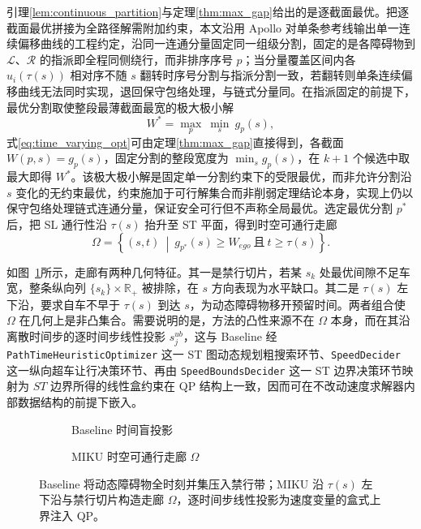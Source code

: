 \documentclass[a4paper,zihao=5]{ctexart}
\theoremstyle{definition}
\begin{document}
引理\ref{lem:continuous_partition}与定理\ref{thm:max_gap}给出的是逐截面最优。把逐截面最优拼接为全路径解需附加约束，本文沿用 Apollo 对单条参考线输出单一连续偏移曲线的工程约定，沿同一连通分量固定同一组级分割，固定的是各障碍物到 $\mathcal{L}$、$\mathcal{R}$ 的指派即全程同侧绕行，而非排序序号 $p$；当分量覆盖区间内各 $u_i(\tau(s))$ 相对序不随 $s$ 翻转时序号分割与指派分割一致，若翻转则单条连续偏移曲线无法同时实现，退回保守包络处理，与链式分量同。在指派固定的前提下，最优分割取使整段最薄截面最宽的极大极小解
\begin{equation}
    W^{*} = \max_{p}\ \min_{s}\ g_p(s),
    \label{eq:time_varying_opt}
\end{equation}
式\eqref{eq:time_varying_opt}可由定理\ref{thm:max_gap}直接得到，各截面 $W(p,s)=g_p(s)$，固定分割的整段宽度为 $\min_s g_p(s)$，在 $k+1$ 个候选中取最大即得 $W^{*}$。该极大极小解是固定单一分割约束下的受限最优，而非允许分割沿 $s$ 变化的无约束最优，约束施加于可行解集合而非削弱定理结论本身，实现上仍以保守包络处理链式连通分量，保证安全可行但不声称全局最优。选定最优分割 $p^{*}$ 后，把 SL 通行性沿 $\tau(s)$ 抬升至 ST 平面，得到时空可通行走廊
\begin{equation}
    \Omega = \left\{ (s,t) \ \middle|\ g_{p^{*}}(s) \geq W_{ego}\ \text{且}\ t \geq \tau(s) \right\}.
    \label{eq:st_corridor}
\end{equation}

如图~\ref{fig:corridor}所示，走廊有两种几何特征。其一是禁行切片，若某 $s_k$ 处最优间隙不足车宽，整条纵向列 $\{s_k\}\times\mathbb{R}_{+}$ 被排除，在 $s$ 方向表现为水平缺口。其二是 $\tau(s)$ 左下沿，要求自车不早于 $\tau(s)$ 到达 $s$，为动态障碍物移开预留时间。两者组合使 $\Omega$ 在几何上是非凸集合。需要说明的是，方法的凸性来源不在 $\Omega$ 本身，而在其沿离散时间步的逐时间步线性投影 $s_j^{ub}$，这与 Baseline 经 \texttt{PathTimeHeuristicOptimizer} 这一 ST 图动态规划粗搜索环节、\texttt{SpeedDecider} 这一纵向超车让行决策环节、再由 \texttt{SpeedBoundsDecider} 这一 ST 边界决策环节映射为 $ST$ 边界所得的线性盒约束在 QP 结构上一致，因而可在不改动速度求解器内部数据结构的前提下嵌入。

\begin{figure}[htbp]
\centering
\begin{subfigure}[b]{0.43\textwidth}
  \centering
  \caption{Baseline 时间盲投影}
\end{subfigure}\hfill
\begin{subfigure}[b]{0.43\textwidth}
  \centering
  \caption{MIKU 时空可通行走廊 $\Omega$}
\end{subfigure}
\caption{ST 平面上的时空可通行走廊与上界收紧}
\caption*{Baseline 将动态障碍物全时刻并集压入禁行带；MIKU 沿 $\tau(s)$ 左下沿与禁行切片构造走廊 $\Omega$，逐时间步线性投影为速度变量的盒式上界注入 QP。}
\label{fig:corridor}
\end{figure}
\end{document}
